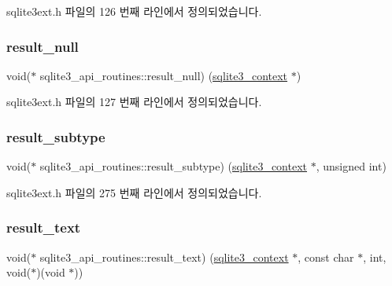 sqlite3ext.\+h 파일의 126 번째 라인에서 정의되었습니다.

\mbox{\label{structsqlite3__api__routines_ab7552d3c8d27f332cb34c45ce9f7b290}} 
\subsubsection{\texorpdfstring{result\+\_\+null}{result\_null}}
{\footnotesize\ttfamily void($\ast$ sqlite3\+\_\+api\+\_\+routines\+::result\+\_\+null) (\hyperlink{sqlite3_8h_a3b519553ffec8fc42b2356f5b1ebdc57}{sqlite3\+\_\+context} $\ast$)}



sqlite3ext.\+h 파일의 127 번째 라인에서 정의되었습니다.

\mbox{\label{structsqlite3__api__routines_ae66c67a4fcb9eef1c7c0f1ba0578176a}} 
\subsubsection{\texorpdfstring{result\+\_\+subtype}{result\_subtype}}
{\footnotesize\ttfamily void($\ast$ sqlite3\+\_\+api\+\_\+routines\+::result\+\_\+subtype) (\hyperlink{sqlite3_8h_a3b519553ffec8fc42b2356f5b1ebdc57}{sqlite3\+\_\+context} $\ast$, unsigned int)}



sqlite3ext.\+h 파일의 275 번째 라인에서 정의되었습니다.

\mbox{\label{structsqlite3__api__routines_abf4e25b69248ca865953d0d0768aa8c0}} 
\subsubsection{\texorpdfstring{result\+\_\+text}{result\_text}}
{\footnotesize\ttfamily void($\ast$ sqlite3\+\_\+api\+\_\+routines\+::result\+\_\+text) (\hyperlink{sqlite3_8h_a3b519553ffec8fc42b2356f5b1ebdc57}{sqlite3\+\_\+context} $\ast$, const char $\ast$, int, void($\ast$)(void $\ast$))}



